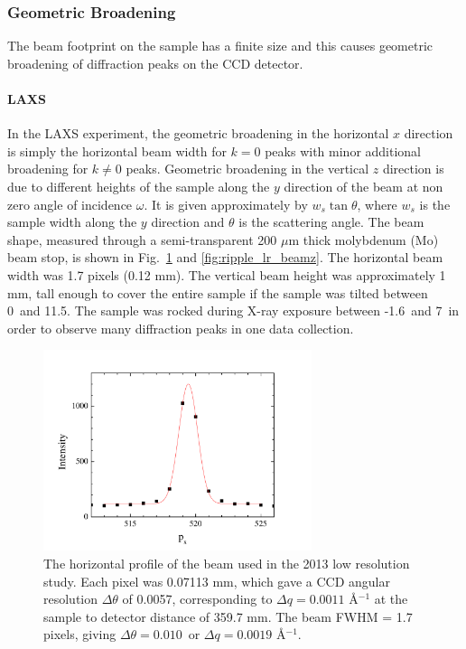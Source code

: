 \subsubsection{Geometric Broadening}\label{sec:geometric_broadening}
The beam footprint on the sample has a finite size and this causes
geometric broadening of diffraction peaks on the CCD detector.

\paragraph{LAXS}
In the LAXS experiment, 
the geometric broadening in the horizontal $x$ direction is simply the 
horizontal beam width for $k=0$ peaks with minor additional broadening
for $k\neq 0$ peaks. Geometric broadening in the vertical $z$ direction
is due to different heights of the sample along the $y$ direction of the beam 
at non zero angle of incidence $\omega$. It is given approximately by
$w_s\tan\theta$, where $w_s$ is the sample width along the $y$
direction and $\theta$ is the scattering angle.
The beam shape, measured through a semi-transparent 200 $\mu$m thick
molybdenum (Mo) beam stop, is shown in Fig.~\ref{fig:ripple_lr_beamx}
and \ref{fig:ripple_lr_beamz}.
The horizontal beam width was 1.7 pixels (0.12 mm). The vertical beam
height was approximately 1 mm, tall enough to cover the entire sample
if the sample was tilted between 0\textdegree\ and 11.5\textdegree. 
The sample was rocked
during X-ray exposure between -1.6\textdegree\ and 7\textdegree\ 
in order to observe many diffraction peaks in one data collection.

\begin{figure}[p]
  \centering
  \includegraphics[width=0.7\textwidth]{figures/ripple/MMs/laxs/beamx_lr}
  \caption{The horizontal profile of the beam used in the 2013 low resolution study.
  Each pixel was 0.07113 mm, which gave a CCD angular resolution $\Delta\theta$ of 
  0.0057\textdegree, corresponding to $\Delta q=0.0011$ \AA$^{-1}$ at the 
  sample to detector distance of 359.7 mm. 
  The beam FWHM = 1.7 pixels, giving $\Delta\theta = 0.010$\textdegree\ or
  $\Delta q= 0.0019$ \AA$^{-1}$.}
  \label{fig:ripple_lr_beamx}
\end{figure}

